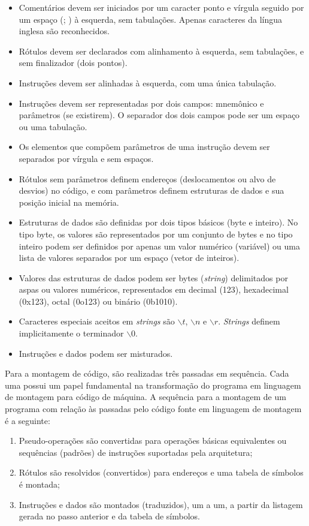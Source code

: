 \documentclass{extreport}
\begin{document}
\begin{itemize}
\item Comentários devem ser iniciados por um caracter ponto e vírgula seguido por um espaço (; ) à esquerda, sem tabulações. Apenas caracteres da língua inglesa são reconhecidos.
\item Rótulos devem ser declarados com alinhamento à esquerda, sem tabulações, e sem finalizador (dois pontos).
\item Instruções devem ser alinhadas à esquerda, com uma única tabulação.
\item Instruções devem ser representadas por dois campos: mnemônico e parâmetros (se existirem). O separador dos dois campos pode ser um espaço ou uma tabulação.
\item Os elementos que compõem parâmetros de uma instrução devem ser separados por vírgula e sem espaços.
\item Rótulos sem parâmetros definem endereços (deslocamentos ou alvo de desvios) no código, e com parâmetros definem estruturas de dados e sua posição inicial na memória.
\item Estruturas de dados são definidas por dois tipos básicos (byte e inteiro). No tipo byte, os valores são representados por um conjunto de bytes e no tipo inteiro podem ser definidos por apenas um valor numérico (variável) ou uma lista de valores separados por um espaço (vetor de inteiros).
\item Valores das estruturas de dados podem ser bytes (\textit{string}) delimitados por aspas ou valores numéricos, representados em decimal (123), hexadecimal (0x123), octal (0o123) ou binário (0b1010).
\item Caracteres especiais aceitos em \textit{strings} são $\backslash t$, $\backslash n$ e $\backslash r$. \textit{Strings} definem implicitamente o terminador \textit{$\backslash 0$}.
\item Instruções e dados podem ser misturados.
\end{itemize}

Para a montagem de código, são realizadas três passadas em sequência. Cada uma possui um papel fundamental na transformação do programa em linguagem de montagem para código de máquina. A sequência para a montagem de um programa com relação às passadas pelo código fonte em linguagem de montagem é a seguinte:

\begin{enumerate}
\item Pseudo-operações são convertidas para operações básicas equivalentes ou sequências (padrões) de instruções suportadas pela arquitetura;
\item Rótulos são resolvidos (convertidos) para endereços e uma tabela de símbolos é montada;
\item Instruções e dados são montados (traduzidos), um a um, a partir da listagem gerada no passo anterior e da tabela de símbolos.
\end{enumerate}
\end{document}

